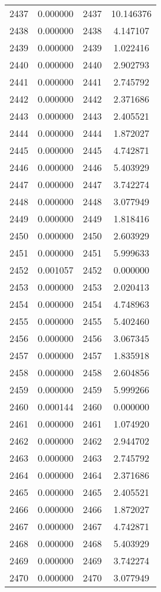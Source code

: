 \documentclass[12pt]{article}
\begin{document}
\begin{longtable}{@{}cccc@{}}
2437 & 0.000000 & 2437 & 10.146376 \\
2438 & 0.000000 & 2438 & 4.147107 \\
2439 & 0.000000 & 2439 & 1.022416 \\
2440 & 0.000000 & 2440 & 2.902793 \\
2441 & 0.000000 & 2441 & 2.745792 \\
2442 & 0.000000 & 2442 & 2.371686 \\
2443 & 0.000000 & 2443 & 2.405521 \\
2444 & 0.000000 & 2444 & 1.872027 \\
2445 & 0.000000 & 2445 & 4.742871 \\
2446 & 0.000000 & 2446 & 5.403929 \\
2447 & 0.000000 & 2447 & 3.742274 \\
2448 & 0.000000 & 2448 & 3.077949 \\
2449 & 0.000000 & 2449 & 1.818416 \\
2450 & 0.000000 & 2450 & 2.603929 \\
2451 & 0.000000 & 2451 & 5.999633 \\
2452 & 0.001057 & 2452 & 0.000000 \\
2453 & 0.000000 & 2453 & 2.020413 \\
2454 & 0.000000 & 2454 & 4.748963 \\
2455 & 0.000000 & 2455 & 5.402460 \\
2456 & 0.000000 & 2456 & 3.067345 \\
2457 & 0.000000 & 2457 & 1.835918 \\
2458 & 0.000000 & 2458 & 2.604856 \\
2459 & 0.000000 & 2459 & 5.999266 \\
2460 & 0.000144 & 2460 & 0.000000 \\
2461 & 0.000000 & 2461 & 1.074920 \\
2462 & 0.000000 & 2462 & 2.944702 \\
2463 & 0.000000 & 2463 & 2.745792 \\
2464 & 0.000000 & 2464 & 2.371686 \\
2465 & 0.000000 & 2465 & 2.405521 \\
2466 & 0.000000 & 2466 & 1.872027 \\
2467 & 0.000000 & 2467 & 4.742871 \\
2468 & 0.000000 & 2468 & 5.403929 \\
2469 & 0.000000 & 2469 & 3.742274 \\
2470 & 0.000000 & 2470 & 3.077949 \\

\end{longtable}
\end{document}
